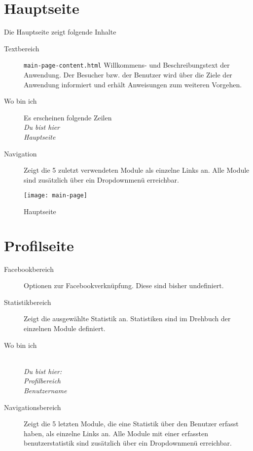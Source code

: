 %
%
%
\section*{Hauptseite}
\label{sec:main-page}

Die Hauptseite zeigt folgende Inhalte
\begin{description}
  \item[Textbereich] \texttt{main-page-content.html} Willkommens- und Beschreibungstext der Anwendung. Der Besucher bzw. der Benutzer wird über die Ziele der Anwendung informiert und erhält Anweisungen zum weiteren Vorgehen.
  \item[Wo bin ich] Es erscheinen folgende Zeilen \emph{\\Du bist hier \\Hauptseite}
  \item[Navigation] Zeigt die 5 zuletzt verwendeten Module als einzelne Links an. Alle Module sind zusätzlich über ein Dropdownmenü erreichbar.
	
\end{description}

\begin{figure}[!ht]
  \centering
  \texttt{[image: main-page]}\\
  \caption{Hauptseite}
  \label{fig:main-page}
\end{figure}



%
%
%
\section*{Profilseite}
\label{sec:profile-page}

\begin{description}
  \item[Facebookbereich] Optionen zur Facebookverknüpfung. Diese sind bisher undefiniert.
  \item[Statistikbereich] Zeigt die ausgewählte Statistik an. Statistiken sind im Drehbuch der einzelnen Module definiert.
  \item[Wo bin ich] \emph{\\Du bist hier:\\Profilbereich\\Benutzername}
  \item[Navigationsbereich] Zeigt die 5 letzten Module, die eine Statistik über den Benutzer erfasst haben, als einzelne 	Links an. Alle Module mit einer erfassten benutzerstatistik sind zusätzlich über ein Dropdownmenü 	erreichbar.
\end{description}


